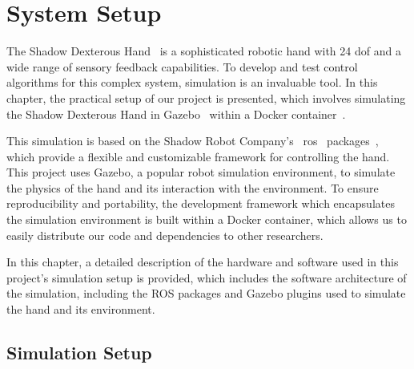 \chapter{System Setup} \label{ch:system-setup}

The Shadow Dexterous Hand~\cite{shadow-dex-hand} is a sophisticated robotic hand with \num{24} \gls{dof} and a wide range of sensory feedback capabilities. To develop and test control algorithms for this complex system, simulation is an invaluable tool. In this chapter, the practical setup of our project is presented, which involves simulating the Shadow Dexterous Hand in Gazebo~\cite{gazebo} within a Docker container~\cite{docker}. \medskip

This simulation is based on the Shadow Robot Company's~\cite{shadow-robotics} \gls{ros}~\cite{ros} packages~\cite{shadow-ros-packages}, which provide a flexible and customizable framework for controlling the hand. This project uses Gazebo, a popular robot simulation environment, to simulate the physics of the hand and its interaction with the environment. To ensure reproducibility and portability, the development framework which encapsulates the simulation environment is built within a Docker container, which allows us to easily distribute our code and dependencies to other researchers. \medskip

In this chapter, a detailed description of the hardware and software used in this project's simulation setup is provided, which includes the software architecture of the simulation, including the ROS packages and Gazebo plugins used to simulate the hand and its environment.



\section{Simulation Setup} \label{sec:system-setup-simulation-setup}

